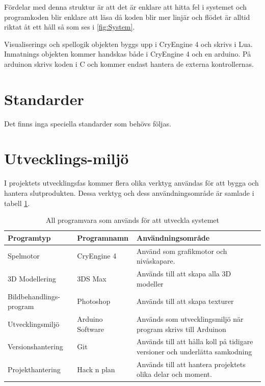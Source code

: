 \documentclass[a4paper,12pt,oneside,final]{extbook}
\begin{document}
Fördelar med denna struktur är att det är enklare att hitta fel i systemet och programkoden blir enklare att läsa då koden blir mer linjär och flödet är alltid riktat åt ett håll så som ses i \ref{fig:System}.

Visualiserings och spellogik objekten byggs upp i CryEngine 4 och skrivs i Lua. Inmatnings objekten kommer handskas både i CryEngine 4 och en arduino. På arduinon skrivs koden i C och kommer endast hantera de externa kontrollernas.  

\section{Standarder}
Det finns inga speciella standarder som behövs följas.

\section{Utvecklings-miljö}

I projektets utvecklingsfas kommer flera olika verktyg användas för att bygga och hantera slutprodukten. Dessa verktyg och dess användningsområde är samlade i tabell \ref{utvecklingsmiljö}. 


\begin{table}[H]
	\centering
	\caption{All programvara som används för att utveckla systemet}
	\label{utvecklingsmiljö}
	\begin{tabular}{ | p{9em} | m{6em} |p{23em}| } 
		\hline
		\textbf{Programtyp}&\textbf{Programnamn}  &\textbf{ Användningsområde} \\ 
		\hline
		Spelmotor &CryEngine 4 & Använd som grafikmotor och nivåskapare. \\ 
		\hline
		3D Modellering &3DS Max &Används till att skapa alla 3D modeller  \\ 
		\hline
		Bildbehandlings-program &Photoshop&Används till att skapa texturer  \\ 
		\hline
		Utvecklingsmiljö &Arduino Software &Används som utvecklingsmiljö när program skrivs till Arduinon  \\ 
		\hline
		Versionshantering &Git &Används till att hålla koll på tidigare versioner och underlätta samkodning  \\ 
		\hline
		Projekthantering &Hack n plan &Används till att hantera projektets olika delar och moment.  \\ 
		\hline

	\end{tabular}
\end{table}
\end{document}
